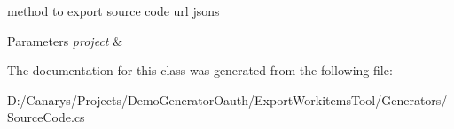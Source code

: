 method to export source code url jsons 


\begin{DoxyParams}{Parameters}
{\em project} & \\
\hline
\end{DoxyParams}


The documentation for this class was generated from the following file\+:\begin{DoxyCompactItemize}
\item 
D\+:/\+Canarys/\+Projects/\+Demo\+Generator\+Oauth/\+Export\+Workitems\+Tool/\+Generators/Source\+Code.\+cs\end{DoxyCompactItemize}
